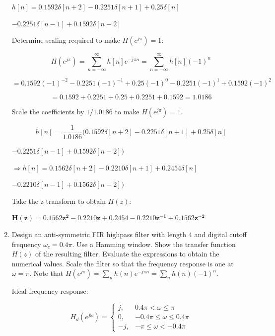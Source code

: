 \documentclass[fleqn]{article}
\begin{document}
\begin{enumerate}[nolistsep]
		$h[n] = 0.1592\delta[n+2] - 0.2251\delta[n+1] + 0.25\delta[n]$
		
		$ - 0.2251\delta[n-1] +  0.1592\delta[n-2]$
		
		Determine scaling required to make $H(e^{j\pi}) = 1$:
		
		\begin{equation*}
			H(e^{j\pi}) = \sum_{n=-\infty}^{\infty}{h[n]e^{-j{\pi}n}} = \sum_{n=-\infty}^{\infty}{h[n](-1)^n}
		\end{equation*}
		
		\begin{equation*}
			= 0.1592(-1)^{-2} - 0.2251(-1)^{-1} + 0.25(-1)^{0} - 0.2251(-1)^{1} +  0.1592(-1)^{2}
		\end{equation*}
		
		\begin{equation*}
			= 0.1592 + 0.2251 + 0.25 + 0.2251 + 0.1592 = 1.0186
		\end{equation*}
		
		Scale the coefficients by $1/1.0186$ to make $H(e^{j\pi}) = 1$.
		
		\begin{equation*}
			h[n] = \frac{1}{1.0186}(0.1592\delta[n+2] - 0.2251\delta[n+1] + 0.25\delta[n]
		\end{equation*}
		
		$- 0.2251\delta[n-1] +  0.1592\delta[n-2])$
		
		$\Rightarrow h[n] = 0.1562\delta[n+2] - 0.2210\delta[n+1] + 0.2454\delta[n]$
		
		$- 0.2210\delta[n-1] +  0.1562\delta[n-2])$
		
		Take the z-transform to obtain $H(z)$:
		
		$\mathbf{H(z) = 0.1562z^2 - 0.2210z + 0.2454 - 0.2210z^{-1} +  0.1562z^{-2}}$
		
		\item Design an anti-symmetric FIR highpass filter with length $4$ and digital cutoff frequency $\omega_c = 0.4\pi$. Use a Hamming window. Show the transfer function $H(z)$ of the resulting filter. Evaluate the expressions to obtain the numerical values. Scale the filter so that the frequency response is one at $\omega = \pi$. Note that $H(e^{j\pi}) = \sum_{n}{h(n)e^{-j{\pi}n}} = \sum_{n}{h(n)(-1)^n}$.
		
		Ideal frequency response:
		
		\begin{equation*}
			H_d(e^{j\omega}) =
			\begin{cases}
				j, & 0.4\pi < \omega \leq \pi \\
				0, & -0.4\pi \leq \omega \leq 0.4\pi \\
				-j, & -\pi \leq \omega < -0.4\pi
			\end{cases}
		\end{equation*}
		

\end{enumerate}
\end{document}
